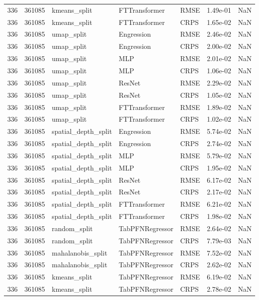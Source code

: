 \begin{tabular}{rrlllrr}
336 & 361085 & kmeans\_split & FTTransformer & RMSE & 1.49e-01 & NaN \\
336 & 361085 & kmeans\_split & FTTransformer & CRPS & 1.65e-02 & NaN \\
336 & 361085 & umap\_split & Engression & RMSE & 2.46e-02 & NaN \\
336 & 361085 & umap\_split & Engression & CRPS & 2.00e-02 & NaN \\
336 & 361085 & umap\_split & MLP & RMSE & 2.01e-02 & NaN \\
336 & 361085 & umap\_split & MLP & CRPS & 1.06e-02 & NaN \\
336 & 361085 & umap\_split & ResNet & RMSE & 2.29e-02 & NaN \\
336 & 361085 & umap\_split & ResNet & CRPS & 1.05e-02 & NaN \\
336 & 361085 & umap\_split & FTTransformer & RMSE & 1.89e-02 & NaN \\
336 & 361085 & umap\_split & FTTransformer & CRPS & 1.02e-02 & NaN \\
336 & 361085 & spatial\_depth\_split & Engression & RMSE & 5.74e-02 & NaN \\
336 & 361085 & spatial\_depth\_split & Engression & CRPS & 2.74e-02 & NaN \\
336 & 361085 & spatial\_depth\_split & MLP & RMSE & 5.79e-02 & NaN \\
336 & 361085 & spatial\_depth\_split & MLP & CRPS & 1.95e-02 & NaN \\
336 & 361085 & spatial\_depth\_split & ResNet & RMSE & 6.17e-02 & NaN \\
336 & 361085 & spatial\_depth\_split & ResNet & CRPS & 2.17e-02 & NaN \\
336 & 361085 & spatial\_depth\_split & FTTransformer & RMSE & 6.21e-02 & NaN \\
336 & 361085 & spatial\_depth\_split & FTTransformer & CRPS & 1.98e-02 & NaN \\
336 & 361085 & random\_split & TabPFNRegressor & RMSE & 2.64e-02 & NaN \\
336 & 361085 & random\_split & TabPFNRegressor & CRPS & 7.79e-03 & NaN \\
336 & 361085 & mahalanobis\_split & TabPFNRegressor & RMSE & 7.52e-02 & NaN \\
336 & 361085 & mahalanobis\_split & TabPFNRegressor & CRPS & 2.62e-02 & NaN \\
336 & 361085 & kmeans\_split & TabPFNRegressor & RMSE & 6.19e-02 & NaN \\
336 & 361085 & kmeans\_split & TabPFNRegressor & CRPS & 2.78e-02 & NaN \\

\end{tabular}
